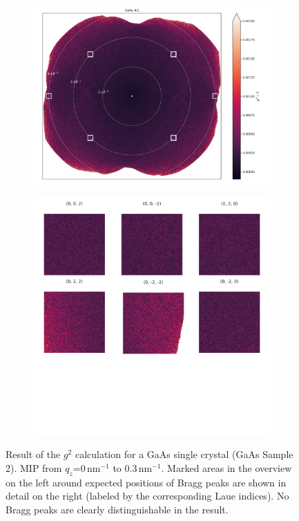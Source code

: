 \begin{figure}
	\centering
	\begin{subfigure}[b]{0.55\textwidth}
		\includegraphics[width=\linewidth]{images/gaas2_overview.pdf}
	\end{subfigure}
	\begin{subfigure}[b]{0.4\textwidth}
		\includegraphics[width=\linewidth]{images/gaas2_zoom.pdf}
	\end{subfigure}
	\caption[Results GaAs Sample 2]{Result of the $g^2$  calculation for a GaAs single crystal (GaAs Sample 2).  MIP from $q_z$=0\,nm$^{-1}$ to 0.3\,nm$^{-1}$. Marked areas in the overview on the left around expected positions of Bragg peaks are shown in detail on the right (labeled by the corresponding Laue indices). No Bragg peaks are  clearly distinguishable in the result.}
	\label{fig:resgaas2}
\end{figure}


